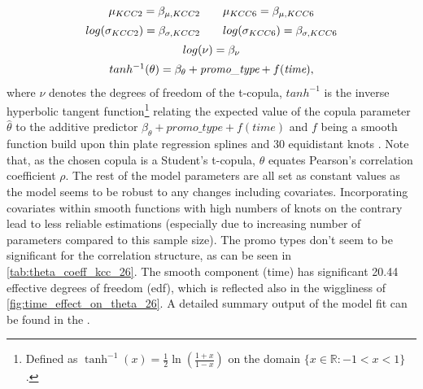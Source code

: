 \begin{equation}
\begin{array}{c}
\mu_{KCC 2}=\beta_{\mu,KCC2} \qquad \mu_{KCC 6}=\beta_{\mu,KCC6}  \\  \noalign{\vskip5pt}

log(\sigma_{KCC 2})=\beta_{\sigma,KCC2} \qquad log(\sigma_{KCC 6})=\beta_{\sigma,KCC6} \\  \noalign{\vskip5pt}

log(\nu) = \beta_{\nu} \\  \noalign{\vskip5pt}

tanh^{-1}(\theta)=\beta_{\theta} + \textit{promo\_type} +f(\textit{time}),
\end{array}
\label{eq:gjrm_formula_26}
\end{equation} 
where $\nu$ denotes the degrees of freedom of the t-copula, $tanh^{-1}$ is the inverse hyperbolic tangent function\footnote{Defined as $\tanh ^{-1} (x)=\frac{1}{2} \ln \left(\frac{1+x}{1-x}\right)$ on the domain $ \{ x \in \mathbb{R}:-1<x<1\}$.} relating the expected value of the copula parameter $\hat{\theta}$ to the additive predictor $\beta_{\theta}+ \textit{promo\_type} +f\left(\textit{time}\right)$ and $f$ being a smooth function build upon thin plate regression splines and 30 equidistant knots \citep{wood2017generalized}. Note that, as the chosen copula is a Student's t-copula, $\theta$ equates Pearson's correlation coefficient $\rho$. The rest of the model parameters are all set as constant values as the model seems to be robust to any changes including covariates. Incorporating covariates within smooth functions with high numbers of knots on the contrary lead to less reliable estimations (especially due to increasing number of parameters compared to this sample size). The promo types don't seem to be significant for the correlation structure, as can be seen in \autoref{tab:theta_coeff_kcc_26}. The smooth component (time) has significant 20.44 effective degrees of freedom (edf), which is reflected also in the wiggliness of \autoref{fig:time_effect_on_theta_26}. A detailed summary output of the model fit can be found in the . \\





